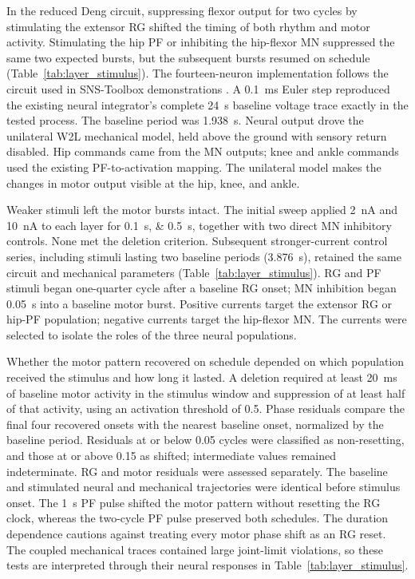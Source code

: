 In the reduced Deng circuit, suppressing flexor output for two cycles by stimulating the extensor RG shifted the timing of both rhythm and motor activity. Stimulating the hip PF or inhibiting the hip-flexor MN suppressed the same two expected bursts, but the subsequent bursts resumed on schedule (Table~\ref{tab:layer_stimulus}). The fourteen-neuron implementation follows the circuit used in SNS-Toolbox demonstrations \citep{deng_neuromechanical_2019,nourse_sns_2023}. A \qty{0.1}{\milli\second} Euler step reproduced the existing neural integrator's complete \qty{24}{\second} baseline voltage trace exactly in the tested process. The baseline period was \qty{1.938}{\second}. Neural output drove the unilateral W2L mechanical model, held above the ground with sensory return disabled. Hip commands came from the MN outputs; knee and ankle commands used the existing PF-to-activation mapping. The unilateral model makes the changes in motor output visible at the hip, knee, and ankle.

Weaker stimuli left the motor bursts intact. The initial sweep applied \qty{+2}{\nano\ampere} and \qty{+10}{\nano\ampere} to each layer for \qtylist{0.1;0.5}{\second}, together with two direct MN inhibitory controls. None met the deletion criterion. Subsequent stronger-current control series, including stimuli lasting two baseline periods (\qty{3.876}{\second}), retained the same circuit and mechanical parameters (Table~\ref{tab:layer_stimulus}). RG and PF stimuli began one-quarter cycle after a baseline RG onset; MN inhibition began \qty{0.05}{\second} into a baseline motor burst. Positive currents target the extensor RG or hip-PF population; negative currents target the hip-flexor MN. The currents were selected to isolate the roles of the three neural populations.

Whether the motor pattern recovered on schedule depended on which population received the stimulus and how long it lasted. A deletion required at least \qty{20}{\milli\second} of baseline motor activity in the stimulus window and suppression of at least half of that activity, using an activation threshold of 0.5. Phase residuals compare the final four recovered onsets with the nearest baseline onset, normalized by the baseline period. Residuals at or below 0.05 cycles were classified as non-resetting, and those at or above 0.15 as shifted; intermediate values remained indeterminate. RG and motor residuals were assessed separately. The baseline and stimulated neural and mechanical trajectories were identical before stimulus onset. The \qty{1}{\second} PF pulse shifted the motor pattern without resetting the RG clock, whereas the two-cycle PF pulse preserved both schedules. The duration dependence cautions against treating every motor phase shift as an RG reset. The coupled mechanical traces contained large joint-limit violations, so these tests are interpreted through their neural responses in Table~\ref{tab:layer_stimulus}.


